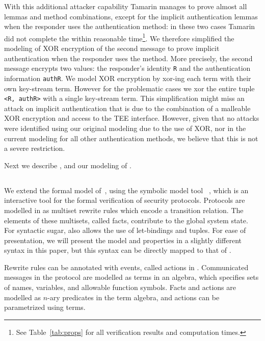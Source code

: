 With this additional attacker capability Tamarin manages to prove
almost all lemmas and method combinations, except for the implicit
authentication lemmas when the responder uses the \mStat{} authentication
method: in these two cases Tamarin did not complete the within reasonable
time\footnote{See Table~\ref{tab:props} for all verification results and
computation times.}.
%
We therefore simplified the modeling of XOR encryption of the second
message to prove implicit authentication when the responder uses the 
\mStat{} method.
%
More precisely, the second message encrypts two values: the responder's identity
\verb|R| and the authentication information \verb|authR|.
%
We model XOR encryption by xor-ing each term with their own key-stream term.
%
However for the problematic cases we xor the entire tuple
\verb|<R, authR>| with a single key-stream term.
%
This simplification might miss an attack on implicit authentication that is due
to the combination of a malleable XOR encryption and access to the TEE interface.
%
However, given that no attacks were identified using our original modeling due
to the use of XOR, nor in the current modeling for all other authentication 
methods, we believe that this is not a severe restriction.
%

Next we describe \mTamarin{}, and our modeling of \mEdhoc{}.
%

\subsection{\mTamarin{}}
\label{sec:tamarin}
We extend the formal \mEdhoc{} model of~\cite{Norr21}, using the symbolic
model tool \mTamarin{}~\cite{DBLP:conf/cav/MeierSCB13}, which is an 
interactive
tool for the formal verification of security protocols.
%
Protocols are modelled in \mTamarin{} as multiset rewrite rules which encode 
a
transition relation.
%
The elements of these multisets, called facts, contribute to the global
system state.
%
For syntactic sugar, \mTamarin{} also allows the use of let-bindings and tuples.
%
For ease of presentation, we will present the model and properties in a
slightly different syntax in this paper, but this syntax can be directly
mapped to that of \mTamarin.
%

Rewrite rules can be annotated with events, called actions in \mTamarin{}.
%
Communicated messages in the protocol are modelled as terms in an algebra,
which specifies sets of names, variables, and allowable function symbols.
%
Facts and actions are modelled as $n$-ary predicates in the term algebra,
and actions can be parametrized using terms.
%

